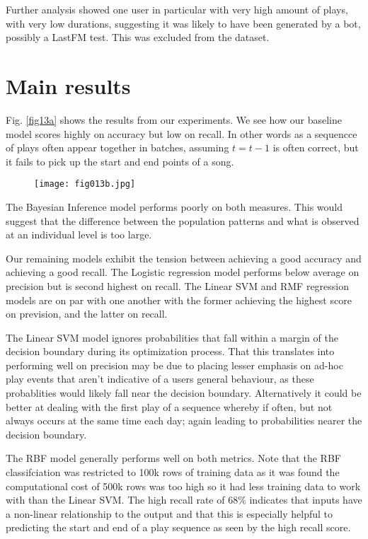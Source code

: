 \newpage

Further analysis showed one user in particular with very high amount of plays, with very low durations, suggesting it was likely to have been generated by a bot, possibly a LastFM test. This was excluded from the dataset.

\section{Main results} %

Fig. \ref{fig13a} shows the results from our experiments. We see how our baseline model scores highly on accuracy but low on recall. In other words as a sequencce of plays often appear together in batches, assuming $t = t-1$ is often correct, but it fails to pick up the start and end points of a song.

\begin{figure}[h!]
	\centering
	\texttt{[image: fig013b.jpg]}
	\caption{}
	\label{fig13b}
\end{figure}  


The Bayesian Inference model performs poorly on both measures. This would suggest that the difference between the population patterns and what is observed at an individual level is too large.

Our remaining models exhibit the tension between achieving a good accuracy and achieving a good recall.
The Logistic regression model performs below average on precision but is second highest on recall. The Linear SVM and RMF regression models are on par with one another with the former achieving the highest score on prevision, and the latter on recall. 

The Linear SVM model ignores probabilities that fall within a margin of the decision boundary during its optimization process. That this translates into performing well on precision may be due to placing lesser emphasis on ad-hoc play events that aren't indicative of a users general behaviour, as these probablities would likely fall near the decision boundary. Alternatively it could be better at dealing with the first play of a sequence whereby if often, but not always occurs at the same time each day; again leading to probabilities nearer the decision boundary.

The RBF model generally performs well on both metrics. Note that the RBF classifciation was restricted to 100k rows of training data as it was found the computational cost of 500k rows was too high so it had less training data to work with than the Linear SVM. The high recall rate of 68\% indicates that inputs have a non-linear relationship to the output and that this is especially helpful to predicting the start and end of a play sequence as seen by the high recall score. 
 
